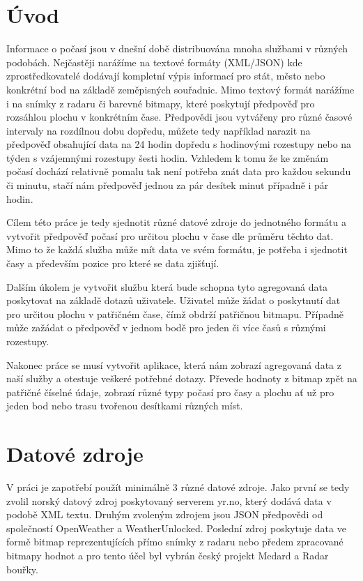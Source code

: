 \documentclass[czech,bachelor,dept460,male,csharp,cpdeclaration]{diploma}
\begin{document}
	
	\MakeTitlePages
	
	\chapter{Úvod}
	
	Informace o počasí jsou v dnešní době distribuována mnoha službami v různých podobách. Nejčastěji narážíme na textové formáty (XML/JSON) kde zprostředkovatelé dodávají kompletní výpis informací pro stát, město nebo konkrétní bod na základě zeměpisných souřadnic. Mimo textový formát narážíme i na snímky z radaru či barevné bitmapy, které poskytují předpověď pro rozsáhlou plochu v konkrétním čase. Předpovědi jsou vytvářeny pro různé časové intervaly na rozdílnou dobu dopředu, můžete tedy například narazit na předpověď obsahující data na 24 hodin dopředu s hodinovými rozestupy nebo na týden s vzájemnými rozestupy šesti hodin. Vzhledem k tomu že ke změnám počasí dochází relativně pomalu tak není potřeba znát data pro každou sekundu či minutu, stačí nám předpověď jednou za pár desítek minut případně i pár hodin.
	
	Cílem této práce je tedy sjednotit různé datové zdroje do jednotného formátu a vytvořit předpověď počasí pro určitou plochu v čase dle průměru těchto dat. Mimo to že každá služba může mít data ve svém formátu, je potřeba i sjednotit časy a především pozice pro které se data zjišťují.
	
	Dalším úkolem je vytvořit službu která bude schopna tyto agregovaná data poskytovat na základě dotazů uživatele. Uživatel může žádat o poskytnutí dat pro určitou plochu v patřičném čase, čímž obdrží patřičnou bitmapu. Případně může zažádat o předpověď v jednom bodě pro jeden či více časů s různými rozestupy.
	
	Nakonec práce se musí vytvořit aplikace, která nám zobrazí agregovaná data z naší služby a otestuje veškeré potřebné dotazy. Převede hodnoty z bitmap zpět na patřičné číselné údaje, zobrazí různé typy počasí pro časy a plochu ať už pro jeden bod nebo trasu tvořenou desítkami různých míst.
	
	\chapter{Datové zdroje}
	
	V práci je zapotřebí použít minimálně 3 různé datové zdroje. Jako první se tedy zvolil norský datový zdroj poskytovaný serverem yr.no, který dodává data v podobě XML textu. Druhým zvoleným zdrojem jsou JSON předpovědi od společností OpenWeather a WeatherUnlocked. Poslední zdroj poskytuje data ve formě bitmap reprezentujících přímo snímky z radaru nebo předem zpracované bitmapy hodnot a pro tento účel byl vybrán český projekt Medard a Radar bouřky.
	
\end{document}
